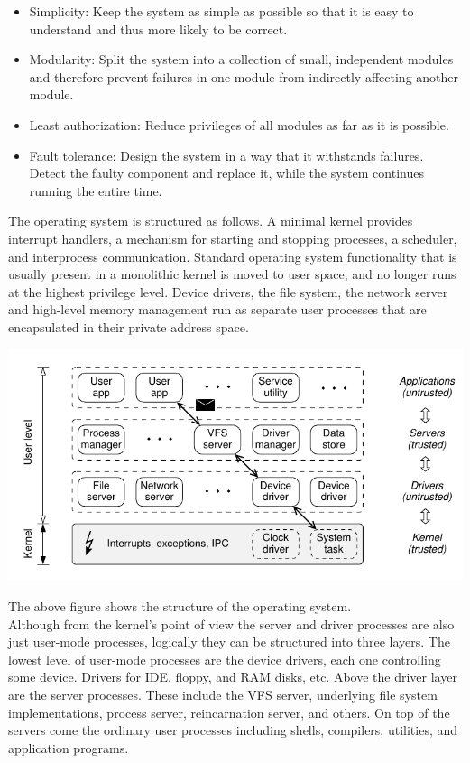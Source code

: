 \begin{itemize}
\item Simplicity: Keep the system as simple as possible so that it is easy to understand and thus more likely to be correct.

\item Modularity: Split the system into a collection of small, independent modules and therefore prevent failures in one module from indirectly affecting another module.

\item Least authorization: Reduce privileges of all modules as far as it is possible.

\item Fault tolerance: Design the system in a way that it withstands failures. Detect the faulty component and replace it, while the system continues running the entire time.
\end{itemize}

The operating system is structured as follows. A minimal kernel provides interrupt handlers, a mechanism for starting and stopping processes, a scheduler, and interprocess communication. Standard operating system functionality that is usually present in a monolithic kernel is moved to user space, and no longer runs at the highest privilege level. Device drivers, the file system, the network server and high-level memory management run as separate user processes that are encapsulated in their private address space.

\includegraphics[scale=0.7]{./pics/minixarch.png}

The above figure shows the structure of the operating system.\\

Although from the kernel’s point of view the server and driver processes are also just user-mode processes, logically they can be structured into three layers. The lowest level of user-mode processes are the device drivers, each one controlling some device. Drivers for IDE, floppy, and RAM disks, etc. Above the driver layer are the server processes. These include the VFS server, underlying file system implementations, process server, reincarnation server, and others. On top of the servers come the ordinary user processes including shells, compilers, utilities, and application programs.\\


